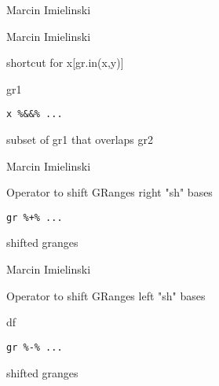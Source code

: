 \documentclass[a4paper]{book}
\begin{document}
%
\begin{Author}\relax
Marcin Imielinski

Marcin Imielinski
\end{Author}
%
\begin{Description}\relax
shortcut for x[gr.in(x,y)]

gr1 
\end{Description}
%
\begin{Usage}
\begin{verbatim}
x %&&% ...
\end{verbatim}
\end{Usage}
%
\begin{Value}
subset of gr1 that overlaps gr2
\end{Value}
%
\begin{Author}\relax
Marcin Imielinski
\end{Author}
%
\begin{Description}\relax
Operator to shift GRanges right "sh" bases
\end{Description}
%
\begin{Usage}
\begin{verbatim}
gr %+% ...
\end{verbatim}
\end{Usage}
%
\begin{Value}
shifted granges
\end{Value}
%
\begin{Author}\relax
Marcin Imielinski
\end{Author}
%
\begin{Description}\relax
Operator to shift GRanges left "sh" bases

df 
\end{Description}
%
\begin{Usage}
\begin{verbatim}
gr %-% ...
\end{verbatim}
\end{Usage}
%
\begin{Value}
shifted granges
\end{Value}
\end{document}
